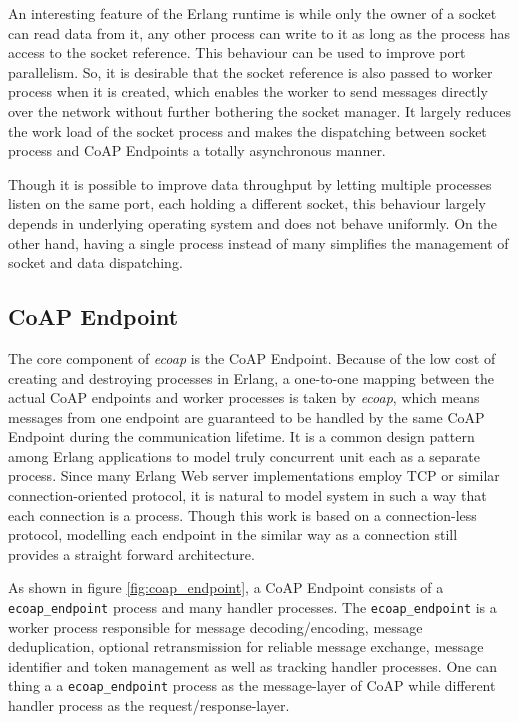 \begin{figure}
\label{fig:coap_socket_manager}
\end{figure}

An interesting feature of the Erlang runtime is while only the owner of a socket can read data from it, any other process can write to it as long as the process has access to the socket reference. This behaviour can be used to improve port parallelism. So, it is desirable that the socket reference is also passed to worker process when it is created, which enables the worker to send messages directly over the network without further bothering the socket manager. It largely reduces the work load of the socket process and makes the dispatching between socket process and CoAP Endpoints a totally asynchronous manner.

Though it is possible to improve data throughput by letting multiple processes listen on the same port, each holding a different socket, this behaviour largely depends in underlying operating system and does not behave uniformly. On the other hand, having a single process instead of many simplifies the management of socket and data dispatching.

\subsection{CoAP Endpoint}

The core component of \textit{ecoap} is the CoAP Endpoint. Because of the low cost of creating and destroying processes in Erlang, a one-to-one mapping between the actual CoAP endpoints and worker processes is taken by \textit{ecoap}, which means messages from one endpoint are guaranteed to be handled by the same CoAP Endpoint during the communication lifetime. It is a common design pattern among Erlang applications to model truly concurrent unit each as a separate process. Since many Erlang Web server implementations employ TCP or similar connection-oriented protocol, it is natural to model system in such a way that each connection is a process. Though this work is based on a connection-less protocol, modelling each endpoint in the similar way as a connection still provides a straight forward architecture. 

As shown in figure \ref{fig:coap_endpoint}, a CoAP Endpoint consists of a \verb|ecoap_endpoint| process and many handler processes. The \verb|ecoap_endpoint| is a worker process responsible for message decoding/encoding, message deduplication, optional retransmission for reliable message exchange, message identifier and token management as well as tracking handler processes. One can thing a a \verb|ecoap_endpoint| process as the message-layer of CoAP while different handler process as the request/response-layer. 

